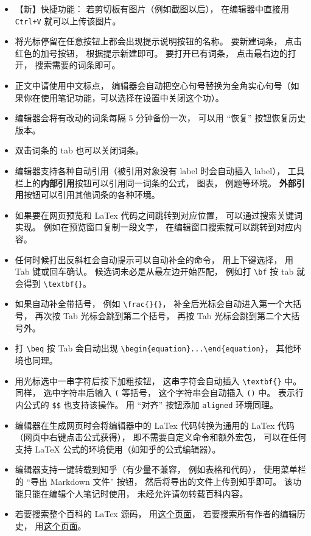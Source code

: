 \begin{itemize}
\item 【新】快捷功能： 若剪切板有图片（例如截图以后）， 在编辑器中直接用 \verb|Ctrl+V| 就可以上传该图片。
\item 将光标停留在任意按钮上都会出现提示说明按钮的名称。 要新建词条， 点击红色的加号按钮， 根据提示新建即可。 要打开已有词条， 点击最右边的打开， 搜索需要的词条即可。
\item 正文中请使用中文标点， 编辑器会自动把空心句号替换为全角实心句号（如果你在使用笔记功能，可以选择在设置中关闭这个功）。
\item 编辑器会将有改动的词条每隔 5 分钟备份一次， 可以用 “恢复” 按钮恢复历史版本。
\item 双击词条的 tab 也可以关闭词条。
\item 编辑器支持各种自动引用（被引用对象没有 label 时会自动插入 label）， 工具栏上的\textbf{内部引用}按钮可以引用同一词条的公式， 图表， 例题等环境。 \textbf{外部引用}按钮可以引用其他词条的各种环境。
\item 如果要在网页预览和 LaTex 代码之间跳转到对应位置， 可以通过搜索关键词实现。 例如在预览窗口复制一段文字， 在编辑窗口搜索就可以跳转到对应内容。
\item 任何时候打出反斜杠会自动提示可以自动补全的命令， 用上下键选择， 用 Tab 键或回车确认。 候选词未必是从最左边开始匹配， 例如打 \verb|\bf| 按 tab 就会得到 \verb|\textbf{}|。
\item 如果自动补全带括号， 例如 \verb|\frac{}{}|， 补全后光标会自动进入第一个大括号， 再次按 Tab 光标会跳到第二个括号， 再按 Tab 光标会跳到第二个大括号外。
\item 打 \verb|\beq| 按 Tab 会自动出现 \verb|\begin{equation}...\end{equation}|， 其他环境也同理。
\item 用光标选中一串字符后按下加粗按钮， 这串字符会自动插入 \verb|\textbf{}| 中。 同样， 选中字符串后输入 \verb|(| 等括号， 这个字符串会自动插入 \verb|()| 中。 表示行内公式的 \verb|$$| 也支持该操作。 用 “对齐” 按钮添加 \verb|aligned| 环境同理。
\item 编辑器在生成网页时会将编辑器中的 LaTex 代码转换为通用的 LaTex 代码（网页中右键点击公式获得）， 即不需要自定义命令和额外宏包， 可以在任何支持 LaTeX 公式的环境使用（如知乎的公式编辑器）。
\item 编辑器支持一键转载到知乎（有少量不兼容， 例如表格和代码）， 使用菜单栏的 “导出 Markdown 文件” 按钮， 然后将导出的文件上传到知乎即可。 该功能只能在编辑个人笔记时使用， 未经允许请勿转载百科内容。
\item 若要搜索整个百科的 LaTex 源码， 用\href{https://github.com/MacroUniverse/PhysWiki-log/tree/master/contents}{这个页面}， 若要搜索所有作者的编辑历史， 用\href{https://github.com/MacroUniverse/PhysWiki-backup}{这个页面}。
\end{itemize}

